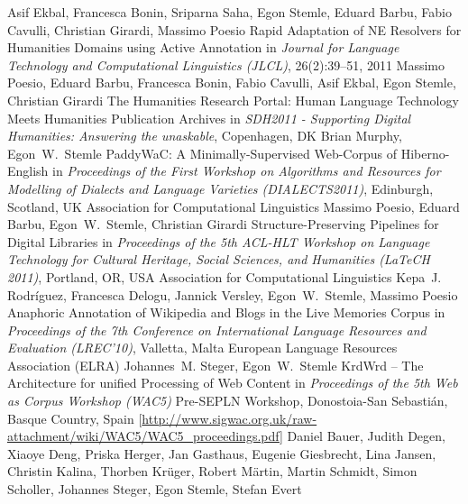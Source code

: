 \documentclass[11pt,a4paper]{moderncv}
\begin{document}
        {Asif Ekbal, Francesca Bonin, Sriparna Saha, Egon Stemle, Eduard Barbu,
        Fabio Cavulli, Christian Girardi, Massimo Poesio}
        {\small Rapid Adaptation of NE Resolvers for Humanities Domains using
        Active Annotation}
        {\small in {\em Journal for Language Technology and Computational Linguistics (JLCL)},
        26(2):39--51, 2011}
        {}
        {}
        {Massimo Poesio, Eduard Barbu, Francesca Bonin, Fabio Cavulli, Asif
        Ekbal, Egon Stemle, Christian Girardi}
        {\small The Humanities Research Portal: Human Language Technology Meets
        Humanities Publication Archives}
        {\small in {\em SDH2011 - Supporting Digital Humanities: Answering the
        unaskable}, Copenhagen, DK}
        {}
        {}
        {Brian Murphy, Egon~W.~Stemle}
        {\small PaddyWaC: A Minimally-Supervised Web-Corpus of Hiberno-English}
        {\small in {\em Proceedings of the First Workshop on Algorithms and
        Resources for Modelling of Dialects and Language Varieties
        (DIALECTS2011)}, Edinburgh, Scotland, UK}
        {\small Association for Computational Linguistics}
        {}
        {Massimo Poesio, Eduard Barbu, Egon~W.~Stemle, Christian Girardi}
        {Structure-Preserving Pipelines for Digital Libraries}
        {\small in {\em Proceedings of the 5th ACL-HLT Workshop on Language
        Technology for Cultural Heritage, Social Sciences, and Humanities
        (LaTeCH 2011)}, Portland, OR, USA}
        {\small Association for Computational Linguistics}
        {}
        {Kepa~J. Rodr{\'i}guez, Francesca Delogu, Jannick Versley,
        Egon~W.~Stemle, Massimo Poesio} {Anaphoric Annotation of Wikipedia
        and Blogs in the Live Memories Corpus}
        {\small in {\em Proceedings of the 7th Conference on International
        Language Resources and Evaluation (LREC'10)}, Valletta, Malta}
        {\small European Language Resources Association (ELRA)}
        {}
        {Johannes~M. Steger, Egon~W.~Stemle}
        {{KrdWrd} -- The Architecture for unified Processing of Web Content}
        {\small in {\em Proceedings of the 5th Web as Corpus Workshop (WAC5)}}
        {\small Pre-SEPLN Workshop, Donostoia-San Sebasti{\'a}n, Basque
        Country, Spain}
        {[\url{http://www.sigwac.org.uk/raw-attachment/wiki/WAC5/WAC5_proceedings.pdf}]}
        {Daniel Bauer, Judith Degen, Xiaoye Deng, Priska Herger, Jan Gasthaus,
        Eugenie Giesbrecht, Lina Jansen, Christin Kalina, Thorben Kr{\"u}ger,
        Robert M{\"a}rtin, Martin Schmidt, Simon Scholler, Johannes Steger,
        Egon Stemle, Stefan Evert}
\end{document}
